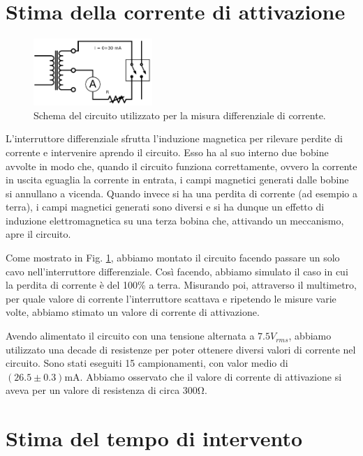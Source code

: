 \section{Stima della corrente di attivazione}

\begin{figure}
	\centering
    \includegraphics[width=0.40\textwidth]{amper.pdf}
    \caption{Schema del circuito utilizzato per la misura differenziale di corrente.}
    \label{fig:amper}
\end{figure}

L'interruttore differenziale sfrutta l'induzione magnetica per rilevare perdite di corrente e intervenire aprendo il circuito. Esso ha al suo interno due bobine avvolte in modo che, quando il circuito funziona correttamente, ovvero la corrente in uscita eguaglia la corrente in entrata, i campi magnetici generati dalle bobine si annullano a vicenda. Quando invece si ha una perdita di corrente (ad esempio a terra), i campi magnetici generati sono diversi e si ha dunque un effetto di induzione elettromagnetica su una terza bobina che, attivando un meccanismo, apre il circuito.

Come mostrato in Fig. \ref{fig:amper}, abbiamo montato il circuito facendo passare un solo cavo nell'interruttore differenziale. Così facendo, abbiamo simulato il caso in cui la perdita di corrente è del 100\% a terra. Misurando poi, attraverso il multimetro, per quale valore di corrente l'interruttore scattava e ripetendo le misure varie volte, abbiamo stimato un valore di corrente di attivazione. 

Avendo alimentato il circuito con una tensione alternata a $7.5V_{rms}$, abbiamo utilizzato una decade di resistenze per poter ottenere diversi valori di corrente nel circuito. Sono stati eseguiti 15 campionamenti, con valor medio di $(26.5\pm0.3)\si{\milli\ampere}$. Abbiamo osservato che il valore di corrente di attivazione si aveva per un valore di resistenza di circa $300\si{\ohm}$. 


\section{Stima del tempo di intervento}


